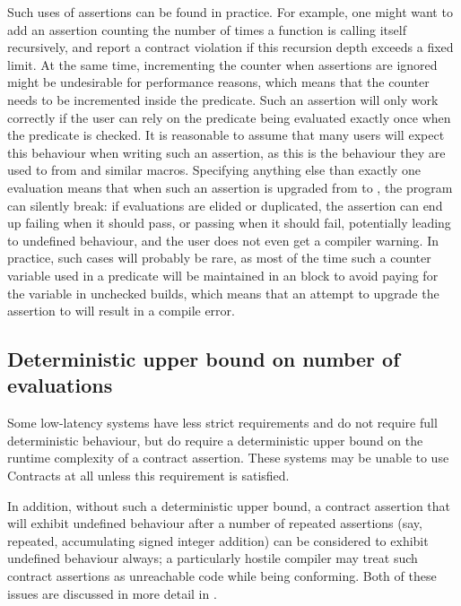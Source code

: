 Such uses of assertions can be found in practice. For example, one might want to add an assertion counting the number of times a function is calling itself recursively, and report a contract violation if this recursion depth exceeds a fixed limit. At the same time, incrementing the counter when assertions are ignored might be undesirable for performance reasons, which means that the counter needs to be incremented inside the predicate. Such an assertion will only work correctly if the user can rely on the predicate being evaluated exactly once when the predicate is checked. It is reasonable to assume that many users will expect this behaviour when writing such an assertion, as this is the behaviour they are used to from  and similar macros. Specifying anything else than exactly one evaluation means that when such an assertion is upgraded from  to , the program can silently break: if evaluations are elided or duplicated, the assertion can end up failing when it should pass, or passing when it should fail, potentially leading to undefined behaviour, and the user does not even get a compiler warning. In practice, such cases will probably be rare, as most of the time such a counter variable used in a predicate will be maintained in an  block to avoid paying for the variable in unchecked builds, which means that an attempt to upgrade the assertion to  will result in a compile error.

\subsection{Deterministic upper bound on number of evaluations}
\label{subsec:upper}

Some low-latency systems have less strict requirements and do not require full deterministic behaviour, but do require a deterministic upper bound on the runtime complexity of a contract assertion. These systems may be unable to use Contracts at all unless this requirement is satisfied.

In addition, without such a deterministic upper bound, a contract assertion that will exhibit undefined behaviour after a number of repeated assertions (say, repeated, accumulating signed integer addition) can be considered to exhibit undefined behaviour always; a particularly hostile compiler may treat such contract assertions as unreachable code while being conforming. Both of these issues are discussed in more detail in \cite{P3119R0}.

